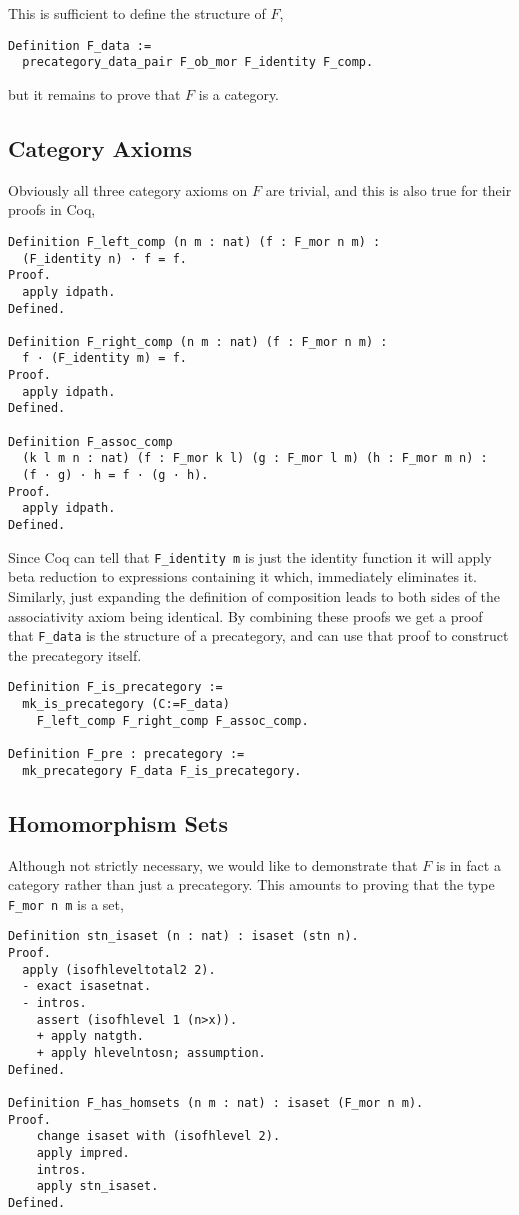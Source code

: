 This is sufficient to define the structure of $F$,
\begin{lstlisting}
Definition F_data := 
  precategory_data_pair F_ob_mor F_identity F_comp.
\end{lstlisting}
but it remains to prove that $F$ is a category.

\subsection{Category Axioms}
Obviously all three category axioms on $F$ are trivial, and this is also true
for their proofs in Coq,
\begin{lstlisting}
Definition F_left_comp (n m : nat) (f : F_mor n m) : 
  (F_identity n) · f = f.
Proof.
  apply idpath.
Defined.

Definition F_right_comp (n m : nat) (f : F_mor n m) : 
  f · (F_identity m) = f.
Proof.
  apply idpath.
Defined.

Definition F_assoc_comp 
  (k l m n : nat) (f : F_mor k l) (g : F_mor l m) (h : F_mor m n) :
  (f · g) · h = f · (g · h).
Proof.
  apply idpath.
Defined.
\end{lstlisting}

Since Coq can tell that \lstinline|F_identity m| is just the identity function it
will apply beta reduction to expressions containing it which, immediately
eliminates it. Similarly, just expanding the definition of composition leads to
both sides of the associativity axiom being identical. By combining these proofs
we get a proof that \lstinline|F_data| is the structure of a precategory, and can
use that proof to construct the precategory itself.

\begin{lstlisting}
Definition F_is_precategory := 
  mk_is_precategory (C:=F_data) 
    F_left_comp F_right_comp F_assoc_comp.

Definition F_pre : precategory := 
  mk_precategory F_data F_is_precategory.
\end{lstlisting}

\subsection{Homomorphism Sets}
Although not strictly necessary, we would like to demonstrate that $F$ is in
fact a category rather than just a precategory. This amounts to proving that the
type \lstinline|F_mor n m| is a set,

\begin{lstlisting}
Definition stn_isaset (n : nat) : isaset (stn n).
Proof.
  apply (isofhleveltotal2 2).
  - exact isasetnat.
  - intros.
    assert (isofhlevel 1 (n>x)).
    + apply natgth.
    + apply hlevelntosn; assumption.
Defined.

Definition F_has_homsets (n m : nat) : isaset (F_mor n m).
Proof.
    change isaset with (isofhlevel 2).
    apply impred.
    intros.
    apply stn_isaset.
Defined.
\end{lstlisting}

